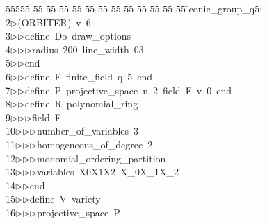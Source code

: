 %
%
\begin{tabbing}
55555 \= 55 \= 55 \= 55 \= 55 \= 55 \= 55 \= 55 \= 55 \= 55 \= 55 \= 55 \= 55 \= \>conic\_group\_q5:\\[0pt]
2\>$\triangleright$\>(ORBITER)\ v\ 6\ \\[0pt]
3\>$\triangleright$\>$\triangleright$\>define\ Do\ draw\_options\ \\[0pt]
4\>$\triangleright$\>$\triangleright$\>$\triangleright$\>radius\ 200\ line\_width\ 03\ \\[0pt]
5\>$\triangleright$\>$\triangleright$\>end\ \\[0pt]
6\>$\triangleright$\>$\triangleright$\>define\ F\ finite\_field\ q\ 5\ end\ \\[0pt]
7\>$\triangleright$\>$\triangleright$\>define\ P\ projective\_space\ n\ 2\ field\ F\ v\ 0\ end\ \\[0pt]
8\>$\triangleright$\>$\triangleright$\>define\ R\ polynomial\_ring\ \\[0pt]
9\>$\triangleright$\>$\triangleright$\>$\triangleright$\>field\ F\ \\[0pt]
10\>$\triangleright$\>$\triangleright$\>$\triangleright$\>number\_of\_variables\ 3\ \\[0pt]
11\>$\triangleright$\>$\triangleright$\>$\triangleright$\>homogeneous\_of\_degree\ 2\ \\[0pt]
12\>$\triangleright$\>$\triangleright$\>$\triangleright$\>monomial\_ordering\_partition\ \\[0pt]
13\>$\triangleright$\>$\triangleright$\>$\triangleright$\>variables\ X0X1X2\ X\_0X\_1X\_2\ \\[0pt]
14\>$\triangleright$\>$\triangleright$\>end\ \\[0pt]
15\>$\triangleright$\>$\triangleright$\>define\ V\ variety\ \\[0pt]
16\>$\triangleright$\>$\triangleright$\>$\triangleright$\>projective\_space\ P\ \\[0pt]

\end{tabbing}
